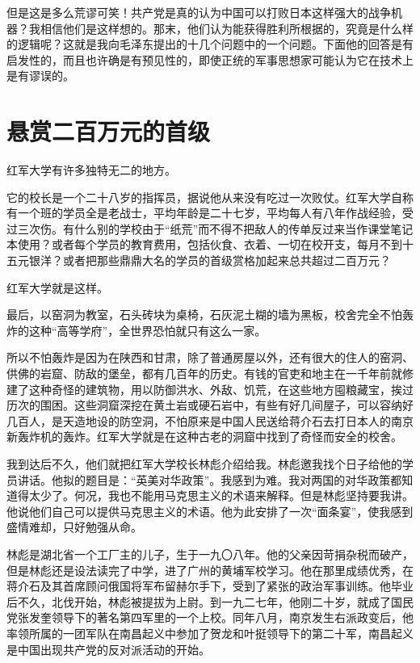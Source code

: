 \documentclass[10pt]{book}
\begin{document}
但是这是多么荒谬可笑！共产党是真的认为中国可以打败日本这样强大的战争机器？我相信他们是这样想的。那末，他们认为能获得胜利所根据的，究竟是什么样的逻辑呢？这就是我向毛泽东提出的十几个问题中的一个问题。下面他的回答是有启发性的，而且也许确是有预见性的，即使正统的军事思想家可能认为它在技术上是有谬误的。



\section{悬赏二百万元的首级}

红军大学有许多独特无二的地方。

它的校长是一个二十八岁的指挥员，据说他从来没有吃过一次败仗。红军大学自称有一个班的学员全是老战士，平均年龄是二十七岁，平均每人有八年作战经验，受过三次伤。有什么别的学校由于“纸荒”而不得不把敌人的传单反过来当作课堂笔记本使用？或者每个学员的教育费用，包括伙食、衣着、一切在校开支，每月不到十五元银洋？或者把那些鼎鼎大名的学员的首级赏格加起来总共超过二百万元？

红军大学就是这样。

最后，以窑洞为教室，石头砖块为桌椅，石灰泥土糊的墙为黑板，校舍完全不怕轰炸的这种“高等学府”，全世界恐怕就只有这么一家。

所以不怕轰炸是因为在陕西和甘肃，除了普通房屋以外，还有很大的住人的窑洞、供佛的岩窟、防敌的堡垒，都有几百年的历史。有钱的官吏和地主在一千年前就修建了这种奇怪的建筑物，用以防御洪水、外敌、饥荒，在这些地方囤粮藏宝，挨过历次的围困。这些洞窟深挖在黄土岩或硬石岩中，有些有好几间屋子，可以容纳好几百人，是天造地设的防空洞，不怕原来是中国人民送给蒋介石去打日本人的南京新轰炸机的轰炸。红军大学就是在这种古老的洞窟中找到了奇怪而安全的校舍。

我到达后不久，他们就把红军大学校长林彪介绍给我。林彪邀我找个日子给他的学员讲话。他拟的题目是：“英美对华政策”。我感到为难。我对两国的对华政策都知道得太少了。何况，我也不能用马克思主义的术语来解释。但是林彪坚持要我讲。他说他们自己可以提供马克思主义的术语。他为此安排了一次“面条宴”，使我感到盛情难却，只好勉强从命。

林彪是湖北省一个工厂主的儿子，生于一九〇八年。他的父亲因苛捐杂税而破产，但是林彪还是设法读完了中学，进了广州的黄埔军校学习。他在那里成绩优秀，在蒋介石及其首席顾问俄国将军布留赫尔手下，受到了紧张的政治军事训练。他毕业后不久，北伐开始，林彪被提拔为上尉。到一九二七年，他刚二十岁，就成了国民党张发奎领导下的著名第四军里的一个上校。同年八月，南京发生右派政变后，他率领所属的一团军队在南昌起义中参加了贺龙和叶挺领导下的第二十军，南昌起义是中国出现共产党的反对派活动的开始。
\end{document}
